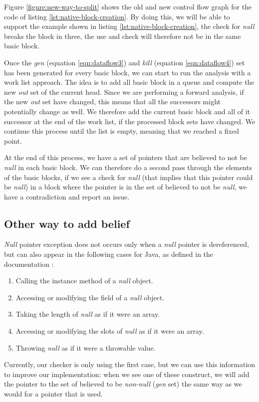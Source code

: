 Figure \ref{figure:new-way-to-split} shows the old and new control flow graph for the code of listing \ref{lst:native-block-creation}. 
By doing this, we will be able to support the example shown in listing \ref{lst:native-block-creation}, the check for \emph{null} breaks the block in three, the use and check will therefore not be in the same basic block.

Once the \emph{gen} (equation \ref{eqn:dataflow3}) and \emph{kill} (equation \ref{eqn:dataflow4}) set has been generated for every basic block, we can start to run the analysis with a work list approach.
The idea is to add all basic block in a queue and compute the new \emph{out} set of the current head. 
Since we are performing a forward analysis, if the new \emph{out} set have changed, this means that all the successors might potentially change as well. 
We therefore add the current basic block and all of it successor at the end of the work list, if the processed block sets have changed. 
We continue this process until the list is empty, meaning that we reached a fixed point.

At the end of this process, we have a set of pointers that are believed to not be \emph{null} in each basic block.
We can therefore do a second pass through the elements of the basic blocks, if we see a check for \emph{null} (that implies that this pointer could be \emph{null}) in a block where the pointer is in the set of believed to not be \emph{null}, we have a contradiction and report an issue.

\subsection{Other way to add belief}
\label{subsec:other_way_to_add_belief}

\emph{Null} pointer exception does not occurs only when a \emph{null} pointer is dereferenced, but can also appear in the following cases for Java, as defined in the documentation \cite{OracleDoc:2019:Online}:

\begin{enumerate}
	\item Calling the instance method of a \emph{null} object. \newline 
	\item Accessing or modifying the field of a \emph{null} object. \newline 
	\item Taking the length of \emph{null} as if it were an array. \newline 
	\item Accessing or modifying the slots of \emph{null} as if it were an array. \newline 
	\item Throwing \emph{null} as if it were a throwable value. \newline 
\end{enumerate}
Currently, our checker is only using the first case, but we can use this information to improve our implementation: when we see one of these construct, we will add the pointer to the set of believed to be \emph{non-null} (\emph{gen} set) the same way as we would for a pointer that is used.


